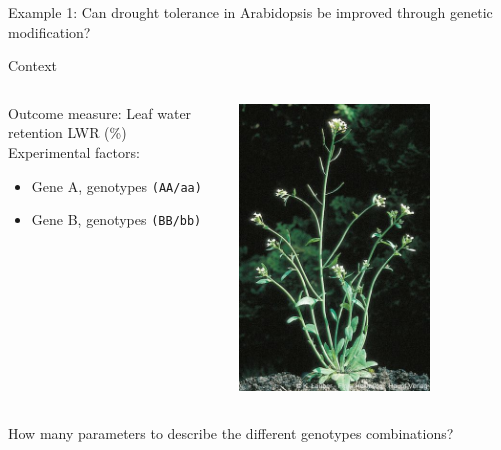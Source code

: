 \documentclass{beamer}
\begin{document}
\begin{frame}{Example 1: Can drought tolerance in Arabidopsis be improved through genetic modification?}

\begin{block}{Context}
\begin{columns}
 \begin{column}{0.8\textwidth}
  Outcome measure: Leaf water retention LWR (\%)\\
  Experimental factors:
    \begin{itemize}
     \item Gene A, genotypes \texttt{(AA/aa)}
     \item Gene B, genotypes \texttt{(BB/bb)}
    \end{itemize}
   \end{column}
   \begin{column}{0.2\textwidth}
    \includegraphics[width=0.7\textwidth]{Figures/arabid}
    
   \end{column}

   \end{columns}
   
\end{block}
How many parameters to describe the different genotypes combinations?
        

\end{frame}
\end{document}
